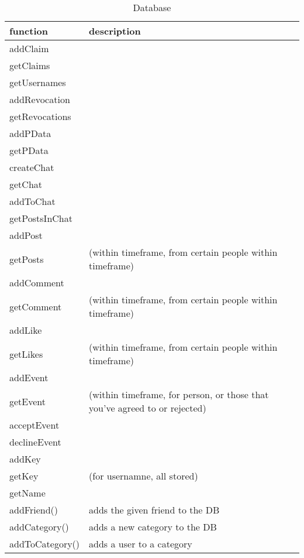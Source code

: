 \begin{table}[h]
    \centering
    \begin{tabular}{p{5cm}p{9cm}}
    function                 & description\\ \hline
    
    addClaim        & \\
    getClaims       & \\
    getUsernames    & \\
    
    addRevocation   & \\
    getRevocations  & \\
    
    addPData        & \\
    getPData        & \\
    
    createChat      & \\
    getChat         & \\
    addToChat       & \\
    getPostsInChat  & \\
    
    addPost         & \\
    getPosts        & (within timeframe, from certain people within timeframe)\\
    
    addComment      & \\
    getComment      & (within timeframe, from certain people within timeframe)\\
    
    addLike         & \\
    getLikes        & (within timeframe, from certain people within timeframe)\\
    
    addEvent        & \\
    getEvent        & (within timeframe, for person, or those that you've agreed to or rejected)\\
    acceptEvent     & \\
    declineEvent    & \\
    
    addKey          & \\
    getKey          & (for usernamne, all stored)\\
    getName         & \\

    addFriend()     & adds the given friend to the DB\\
    addCategory()   & adds a new category to the DB\\
    addToCategory() & adds a user to a category\\
    \end{tabular}
    \caption{Database}
\end{table}

